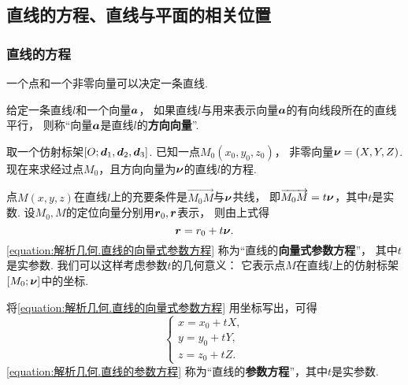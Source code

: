\subsection{直线的方程、直线与平面的相关位置}

\subsubsection{直线的方程}
一个点和一个非零向量可以决定一条直线.

给定一条直线\(l\)和一个向量\(\boldsymbol{a}\)，
如果直线\(l\)与用来表示向量\(\boldsymbol{a}\)的有向线段所在的直线平行，
则称“向量\(\boldsymbol{a}\)是直线\(l\)的\textbf{方向向量}”.

取一个仿射标架\([O;\boldsymbol{d}_1,\boldsymbol{d}_2,\boldsymbol{d}_3]\).
已知一点\(M_0(x_0,y_0,z_0)\)，
非零向量\(\boldsymbol{\nu}=(X,Y,Z)\).
现在来求经过点\(M_0\)，且方向向量为\(\boldsymbol{\nu}\)的直线\(l\)的方程.

点\(M(x,y,z)\)在直线\(l\)上的充要条件是\(\vec{M_0 M}\)与\(\boldsymbol{\nu}\)共线，
即\(\overrightarrow{M_0 M} = t \boldsymbol{\nu}\)，其中\(t\)是实数.
设\(M_0,M\)的定位向量分别用\(\boldsymbol{r}_0,\boldsymbol{r}\)表示，
则由上式得
\begin{equation}\label{equation:解析几何.直线的向量式参数方程}
	\boldsymbol{r} = r_0 + t \boldsymbol{\nu}.
\end{equation}
\cref{equation:解析几何.直线的向量式参数方程} 称为“直线的\textbf{向量式参数方程}”，
其中\(t\)是实参数.
我们可以这样考虑参数\(t\)的几何意义：
它表示点\(M\)在直线\(l\)上的仿射标架\([M_0;\boldsymbol{\nu}]\)中的坐标.

将\cref{equation:解析几何.直线的向量式参数方程} 用坐标写出，可得
\begin{equation}\label{equation:解析几何.直线的参数方程}
	\left\{ \begin{array}{l}
		x = x_0 + t X, \\
		y = y_0 + t Y, \\
		z = z_0 + t Z.
	\end{array} \right.
\end{equation}
\cref{equation:解析几何.直线的参数方程} 称为“直线的\textbf{参数方程}”，其中\(t\)是实参数.

